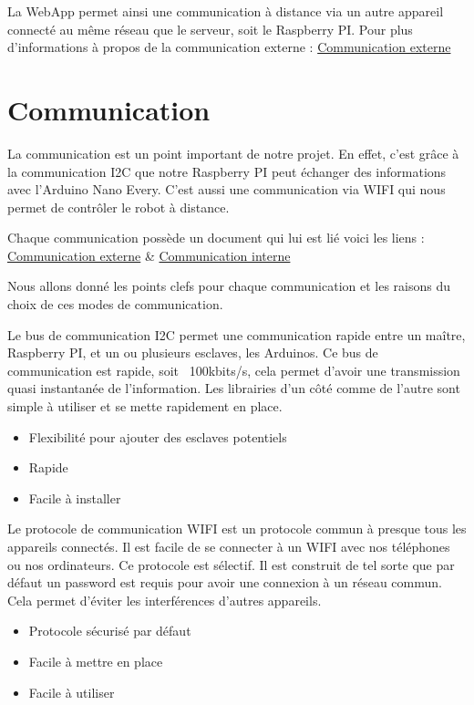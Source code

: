 \documentclass[
	a4paper,									%
	11pt,										%
	twoside,									%
	openright,									%
	notitlepage,									%
	parskip=half,								%
]{scrreprt}										%
\begin{document}
La WebApp permet ainsi une communication à distance via un autre appareil connecté au même réseau que le serveur, soit 
le Raspberry PI. Pour plus d'informations à propos de la communication externe : \href{run:./Comm_Externe}{Communication externe} \par

\section{Communication}

La communication est un point important de notre projet. En effet, c'est grâce à la communication I2C que notre Raspberry PI peut 
échanger des informations avec l'Arduino Nano Every. C'est aussi une communication via WIFI qui nous permet de contrôler le robot 
à distance. \par

Chaque communication possède un document qui lui est lié voici les liens : \href{run:./Comm_Externe}{Communication externe} \&
\href{run:./Comm_interne}{Communication interne} \par

Nous allons donné les points clefs pour chaque communication et les raisons du choix de ces modes de communication. \par

Le bus de communication I2C permet une communication rapide entre un maître, Raspberry PI, et un ou plusieurs esclaves, les Arduinos. 
Ce bus de communication est rapide, soit ~100kbits/s, cela permet d'avoir une transmission quasi instantanée de l'information.
Les librairies d'un côté comme de l'autre sont simple à utiliser et se mette rapidement en place. 

\newpage
\begin{itemize}
	\item Flexibilité pour ajouter des esclaves potentiels
	\item Rapide
	\item Facile à installer
\end{itemize}

Le protocole de communication WIFI est un protocole commun à presque tous les appareils connectés. Il est facile de se connecter 
à un WIFI avec nos téléphones ou nos ordinateurs. Ce protocole est sélectif. Il est construit de tel sorte que par défaut un 
password est requis pour avoir une connexion à un réseau commun. Cela permet d'éviter les interférences d'autres appareils. 

\begin{itemize}
	\item Protocole sécurisé par défaut 
	\item Facile à mettre en place
	\item Facile à utiliser
\end{itemize}
\end{document}
